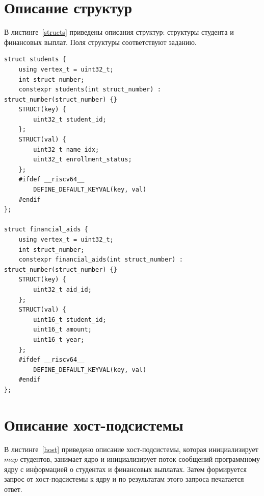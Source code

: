 \documentclass{article}
\begin{document}
\clearpage\section{Описание структур}

В листинге~\ref{structs} приведены описания структур: структуры студента и финансовых выплат. Поля структуры соответствуют
заданию. 

\begin{lstlisting}[style=lang, label=structs, caption=Описание  структур]
struct students {
    using vertex_t = uint32_t;
    int struct_number;
    constexpr students(int struct_number) : struct_number(struct_number) {}
    STRUCT(key) {
        uint32_t student_id;
    };
    STRUCT(val) {
        uint32_t name_idx;
        uint32_t enrollment_status;
    };
    #ifdef __riscv64__
        DEFINE_DEFAULT_KEYVAL(key, val)
    #endif
};

struct financial_aids {
    using vertex_t = uint32_t;
    int struct_number;
    constexpr financial_aids(int struct_number) : struct_number(struct_number) {}
    STRUCT(key) {
        uint32_t aid_id;
    };
    STRUCT(val) {
        uint16_t student_id; 
        uint16_t amount;
        uint16_t year; 
    };
    #ifdef __riscv64__
        DEFINE_DEFAULT_KEYVAL(key, val)
    #endif
};
\end{lstlisting}

\clearpage\section{Описание хост-подсистемы}

В листинге~\ref{host} приведено описание хост-подсистемы, которая инициализирует $map$ студентов, занимает ядро и 
инициализирует поток сообщений программному ядру с информацией о студентах и финансовых выплатах. Затем формируется
запрос от хост-подсистемы к ядру и по результатам этого запроса печатается ответ.
\end{document}
